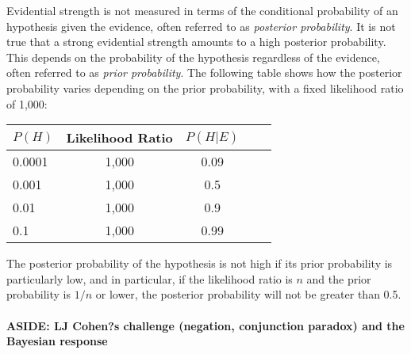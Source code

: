 \documentclass[10pt]{article}
\begin{document}
Evidential strength is not measured in terms of the conditional probability of an hypothesis 
given the evidence, often referred to as \textit{posterior probability}. It is not true  that a strong evidential strength amounts 
to a high posterior probability. This depends on the probability of the hypothesis 
regardless of the evidence, often referred to as \textit{prior probability}. 
The following table shows how the posterior probability 
varies depending on the prior probability, 
with a fixed likelihood ratio of 1,000:

\vspace{2mm}
\hspace{0.5cm}
\begin{centering}
\begin{tabular}{lcccc}
\hline
$P(H)$ & Likelihood Ratio  &   $P(H | E)$ \\
\hline
0.0001 & 1,000 & 0.09  \\
0.001 & 1,000 & 0.5  \\
0.01  & 1,000 &  0.9 \\
0.1 & 1,000 &   0.99 \\
\hline
\end{tabular}
\end{centering}
\vspace{2mm}


The posterior probability of the hypothesis is not high 
if its prior probability is particularly low, and in particular, 
if the likelihood ratio is $n$ and the prior probability is $1/n$ or lower, the posterior 
probability will not be greater than 0.5.











\paragraph{ASIDE: LJ Cohen?s challenge (negation, conjunction paradox) and the Bayesian response}
\end{document}
